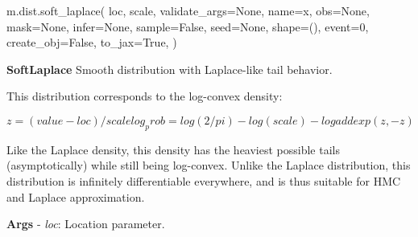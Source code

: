 \documentclass[
  letterpaper,
  DIV=11,
  numbers=noendperiod]{scrartcl}
\newenvironment{Shaded}{\begin{snugshade}}{\end{snugshade}}
\newcommand{\DecValTok}[1]{\textcolor[rgb]{0.68,0.00,0.00}{#1}}
\newcommand{\NormalTok}[1]{\textcolor[rgb]{0.00,0.23,0.31}{#1}}
\newcommand{\OperatorTok}[1]{\textcolor[rgb]{0.37,0.37,0.37}{#1}}
\newcommand{\StringTok}[1]{\textcolor[rgb]{0.13,0.47,0.30}{#1}}
\newcommand{\VariableTok}[1]{\textcolor[rgb]{0.07,0.07,0.07}{#1}}
\begin{document}
\begin{Shaded}
\begin{Highlighting}[]
\NormalTok{m.dist.soft\_laplace(}
\NormalTok{    loc,}
\NormalTok{    scale,}
\NormalTok{    validate\_args}\OperatorTok{=}\VariableTok{None}\NormalTok{,}
\NormalTok{    name}\OperatorTok{=}\StringTok{\textquotesingle{}x\textquotesingle{}}\NormalTok{,}
\NormalTok{    obs}\OperatorTok{=}\VariableTok{None}\NormalTok{,}
\NormalTok{    mask}\OperatorTok{=}\VariableTok{None}\NormalTok{,}
\NormalTok{    infer}\OperatorTok{=}\VariableTok{None}\NormalTok{,}
\NormalTok{    sample}\OperatorTok{=}\VariableTok{False}\NormalTok{,}
\NormalTok{    seed}\OperatorTok{=}\VariableTok{None}\NormalTok{,}
\NormalTok{    shape}\OperatorTok{=}\NormalTok{(),}
\NormalTok{    event}\OperatorTok{=}\DecValTok{0}\NormalTok{,}
\NormalTok{    create\_obj}\OperatorTok{=}\VariableTok{False}\NormalTok{,}
\NormalTok{    to\_jax}\OperatorTok{=}\VariableTok{True}\NormalTok{,}
\NormalTok{)}
\end{Highlighting}
\end{Shaded}

\textbf{SoftLaplace} Smooth distribution with Laplace-like tail
behavior.

This distribution corresponds to the log-convex density:

\[
  z = (value - loc) / scale
  log_prob = log(2 / pi) - log(scale) - logaddexp(z, -z)
  \]

Like the Laplace density, this density has the heaviest possible tails
(asymptotically) while still being log-convex. Unlike the Laplace
distribution, this distribution is infinitely differentiable everywhere,
and is thus suitable for HMC and Laplace approximation.

\textbf{Args} - \emph{loc}: Location parameter.
\end{document}

